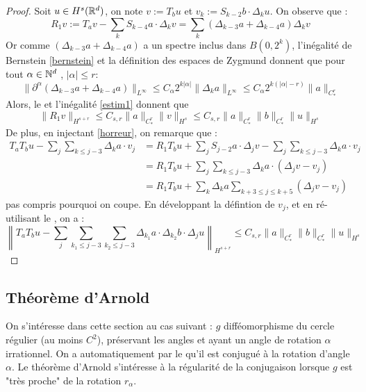 \documentclass[11pt,a4paper]{article}
\begin{document}
\begin{proof}
Soit $u\in H^s(\mathbb R^d)$, on note $v:=T_bu$ et $v_k:=S_{k-2}b\cdot\Delta_ku$. On observe que :
\begin{equation}\label{horreur}
R_1v:=T_av-\sum_k S_{k-4}a\cdot\Delta_kv = \sum_k (\Delta_{k-3}a + \Delta_{k-4}a)\Delta_kv
\end{equation}
Or comme $(\Delta_{k-3}a + \Delta_{k-4}a)$ a un spectre inclus dans $B(0,2^k)$, l'inégalité de Bernstein \eqref{bernstein} et la définition des espaces de Zygmund donnent que pour tout $\alpha \in \mathbb N^d$ , $|\alpha| \leq r$:
\begin{equation*}
\|\partial^\alpha(\Delta_{k-3}a + \Delta_{k-4}a)\|_{L^\infty} \leq C_\alpha 2^{k|\alpha|}\|\Delta_ka\|_{L^\infty} \leq C_\alpha 2^{k(|\alpha|-r)} \|a\|_{C^r_*}
\end{equation*}
Alors, le  et l'inégalité \eqref{estim1} donnent que 
\begin{equation*}
\|R_1v\|_{H^{s+r}} \leq C_{s,r} \|a\|_{C^r_*} \|v\|_{H^s} \leq C_{s,r} \|a\|_{C^r_*} \|b\|_{C^r_*} \|u\|_{H^s}
\end{equation*}
De plus, en injectant \eqref{horreur}, on remarque que :
\begin{align*}
T_aT_bu - \sum_j \sum_{k \leq j-3} \Delta_ka\cdot v_j &= R_1T_bu + \sum_j S_{j-2}a\cdot\Delta_jv - \sum_j \sum_{k \leq j-3} \Delta_ka\cdot v_j \\
&=R_1T_bu + \sum_j \sum_{k \leq j-3} \Delta_ka\cdot (\Delta_jv - v_j) \\
&=R_1T_bu + \sum_k \Delta_ka \sum_{k+3 \leq j \leq k+5} (\Delta_jv - v_j) 
\end{align*}
pas compris pourquoi on coupe. En développant la défintion de $v_j$, et en ré-utilisant le , on a :
\begin{equation}
\left\| T_aT_bu - \sum_j \sum_{k_1 \leq j-3} \sum_{k_2\leq j-3} \Delta_{k_1}a\cdot \Delta_{k_2}b \cdot \Delta_j u \right\|_{H^{s+r}} \leq C_{s,r} \|a\|_{C^r_*} \|b\|_{C^r_*} \|u\|_{H^s}
\end{equation}
\end{proof}

\subsection{Théorème d'Arnold}
On s'intéresse dans cette section au cas suivant : $g$ difféomorphisme du cercle régulier (au moins $C^2$), préservant les angles et ayant un angle de rotation $\alpha$ irrationnel. On a automatiquement par le  qu'il est conjugué à la rotation d'angle $\alpha$. Le théorème d'Arnold s'intéresse à la régularité de la conjugaison lorsque $g$ est "très proche" de la rotation $r_\alpha$.
\end{document}
